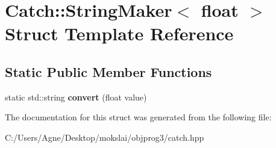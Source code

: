 \hypertarget{struct_catch_1_1_string_maker_3_01float_01_4}{}\section{Catch\+:\+:String\+Maker$<$ float $>$ Struct Template Reference}
\label{struct_catch_1_1_string_maker_3_01float_01_4}
\subsection*{Static Public Member Functions}
\begin{DoxyCompactItemize}
\item 
\mbox{\label{struct_catch_1_1_string_maker_3_01float_01_4_a7ffacc6fa46a338200f3fbb2ee078648}} 
static std\+::string {\bfseries convert} (float value)
\end{DoxyCompactItemize}


The documentation for this struct was generated from the following file\+:\begin{DoxyCompactItemize}
\item 
C\+:/\+Users/\+Agne/\+Desktop/mokslai/objprog3/catch.\+hpp\end{DoxyCompactItemize}
